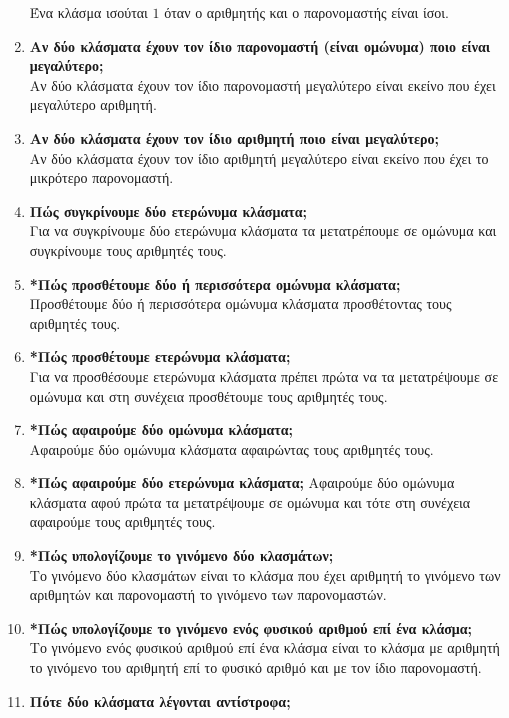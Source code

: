 \documentclass[a4paper,11pt]{report}
\begin{document}
\begin{enumerate}
       Ένα κλάσμα ισούται $1$ όταν ο αριθμητής και ο παρονομαστής είναι ίσοι.
\item \textbf{Αν δύο κλάσματα έχουν τον ίδιο παρονομαστή (είναι ομώνυμα) ποιο είναι μεγαλύτερο;}\\
      Αν δύο κλάσματα έχουν τον ίδιο παρονομαστή μεγαλύτερο είναι εκείνο που έχει μεγαλύτερο αριθμητή.
\item \textbf{Αν δύο κλάσματα έχουν τον ίδιο αριθμητή ποιο είναι μεγαλύτερο;}\\
      Αν δύο κλάσματα έχουν τον ίδιο αριθμητή μεγαλύτερο είναι εκείνο που έχει το μικρότερο παρονομαστή.
\item \textbf{Πώς συγκρίνουμε δύο ετερώνυμα κλάσματα;}\\
      Για να συγκρίνουμε δύο ετερώνυμα κλάσματα τα μετατρέπουμε σε ομώνυμα και συγκρίνουμε τους αριθμητές τους.
\item \textbf{*Πώς προσθέτουμε δύο ή περισσότερα ομώνυμα κλάσματα;}\\
      Προσθέτουμε δύο ή περισσότερα ομώνυμα κλάσματα προσθέτοντας τους αριθμητές τους.
\item \textbf{*Πώς προσθέτουμε ετερώνυμα κλάσματα;}\\
      Για να προσθέσουμε ετερώνυμα κλάσματα πρέπει πρώτα να τα μετατρέψουμε σε ομώνυμα και στη συνέχεια 
      προσθέτουμε τους αριθμητές τους.
\item \textbf{*Πώς αφαιρούμε δύο ομώνυμα κλάσματα;}\\
       Αφαιρούμε δύο ομώνυμα κλάσματα αφαιρώντας τους αριθμητές τους.
\item \textbf{*Πώς αφαιρούμε δύο ετερώνυμα κλάσματα;}
       Αφαιρούμε δύο ομώνυμα κλάσματα αφού πρώτα τα μετατρέψουμε σε ομώνυμα και τότε στη συνέχεια 
       αφαιρούμε τους αριθμητές τους.
\item \textbf{*Πώς υπολογίζουμε το γινόμενο δύο κλασμάτων;}\\
       Το γινόμενο δύο κλασμάτων είναι το κλάσμα που έχει αριθμητή το γινόμενο των αριθμητών και 
       παρονομαστή το γινόμενο των παρονομαστών.
\item \textbf{*Πώς υπολογίζουμε το γινόμενο ενός φυσικού αριθμού επί ένα κλάσμα;}\\
      Το γινόμενο ενός φυσικού αριθμού επί ένα κλάσμα είναι το κλάσμα με αριθμητή το γινόμενο του αριθμητή 
      επί το φυσικό αριθμό και με τον ίδιο παρονομαστή.
\item \textbf{Πότε δύο κλάσματα λέγονται αντίστροφα;}\\

\end{enumerate}
\end{document}
